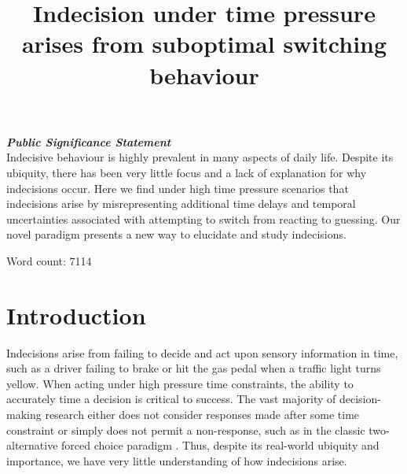 \documentclass[man,donotrepeattitle,floatsintext,letterpaper,12pt]{apa7}
\title{Indecision under time pressure arises from suboptimal switching behaviour}
\begin{document}
\maketitle
\noindent \textbf{\emph{Public Significance Statement}}
\\
\noindent Indecisive behaviour is highly prevalent in many aspects of daily life. Despite its ubiquity, there has been very little focus and a lack of explanation for why indecisions occur. Here we find under high time pressure scenarios that indecisions arise by misrepresenting additional time delays and temporal uncertainties associated with attempting to switch from reacting to guessing. Our novel paradigm presents a new way to elucidate and study indecisions.

\newpage
Word count: 7114
\section{Introduction}
\vspace{2mm}
\noindent Indecisions arise from failing to decide and act upon sensory information in time, such as a driver failing to brake or hit the gas pedal when a traffic light turns yellow. When acting under high pressure time constraints, the ability to accurately time a decision is critical to success. The vast majority of decision-making research either does not consider responses made after some time constraint or simply does not permit a non-response, such as in the classic two-alternative forced choice paradigm \autocite{zacksenhouseRobustOptimalStrategies2010, bogaczPhysicsOptimalDecision2006, choMechanismsUnderlyingDependencies2002, joganNewTwoalternativeForced2014, ratcliffDiffusionDecisionModel2008,ulrichThresholdEstimationTwoalternative2004,tylerSignalDetectionTheory2000}. Thus, despite its real-world ubiquity and importance, we have very little understanding of how indecisions arise.
\end{document}
